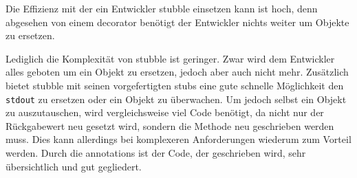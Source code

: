 Die Effizienz mit der ein Entwickler stubble einsetzen kann ist hoch, denn
abgesehen von einem \gls{decorator} benötigt der Entwickler nichts weiter um
Objekte zu ersetzen.

Lediglich die Komplexität von stubble ist geringer. Zwar wird dem Entwickler
alles geboten um ein Objekt zu ersetzen, jedoch aber auch nicht mehr.
Zusätzlich bietet stubble mit seinen vorgefertigten \Glspl{stub} eine gute
schnelle Möglichkeit den \lstinline{stdout} zu ersetzen oder ein Objekt zu
überwachen. Um jedoch selbst ein Objekt zu auszutauschen, wird vergleichsweise
viel Code benötigt, da nicht nur der Rückgabewert neu gesetzt wird,
sondern die Methode neu geschrieben werden muss. Dies kann allerdings bei
komplexeren Anforderungen wiederum zum Vorteil werden. Durch die
\Glspl{annotation} ist der Code, der geschrieben wird, sehr übersichtlich und 
gut
gegliedert.